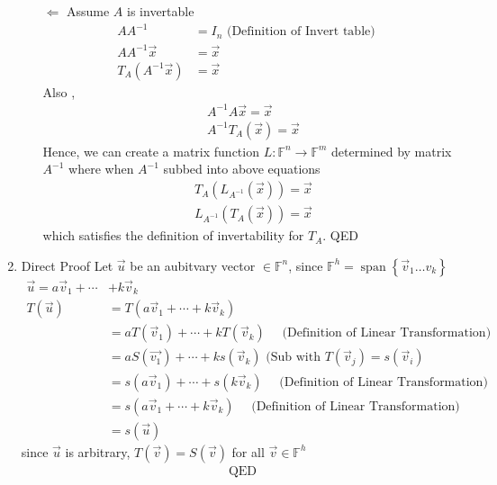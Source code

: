 \documentclass[11pt]{article}
\begin{document}
\begin{enumerate}[{\bf Q1.}]
\begin{enumerate}
			\newline $\Leftarrow$ \newline 
			Assume $A$ is invertable
			$$
			\begin{aligned}
			A A^{-1} & =I_n \text { (Definition of Invert table) } \\
			A A^{-1} \vec{x} & =\vec{x} \\
			T_A\left(A^{-1} \vec{x}\right) & =\vec{x}
			\end{aligned}
			$$
			Also ,
			$$
			\begin{aligned}
			& A^{-1} A \vec{x}=\vec{x} \\
			& A^{-1} T_A(\vec{x})=\vec{x}
			\end{aligned}
			$$
			Hence, we can create a matrix function $L: \mathbb{F}^n \rightarrow \mathbb{F}^m$ determined by matrix $A^{-1}$ where when $A^{-1}$ subbed into above equations
			$$
			\begin{aligned}
			& T_A\left(L_{A^{-1}}(\vec{x})\right)=\vec{x} \\
			& L_{A^{-1}}\left(T_A(\vec{x})\right)=\vec{x}
			\end{aligned}
			$$
			which satisfies the definition of invertability for $T_A$. \newline
			QED \newline
		\end{enumerate}
		
		\newpage
		
		\item
		Direct Proof \newline
		Let $\vec{u}$ be an aubitvary vector $\in \mathbb{F}^n$,
		since $\mathbb{F}^h=\operatorname{span}\left\{\vec{v}_1 \ldots v_k\right\}$
		$$
		\begin{aligned}
		\vec{u}=a \vec{v}_1+\cdots & +k \vec{v}_k \\
		T(\vec{u}) & =T\left(a \vec{v}_1+\cdots+k \vec{v}_k\right) \\
		& =a T\left(\vec{v}_1\right)+\cdots+k T\left(\vec{v}_k\right) \quad \text { (Definition of Linear Transformation) } \\
		& =a S\left(\overrightarrow{v_1}\right)+\cdots+k s\left(\vec{v}_k\right) \text { (Sub with } T\left(\vec{v}_j\right)=s\left(\vec{v}_i\right) \\
		& =s\left(a \vec{v}_1\right)+\cdots+s\left(k \vec{v}_k\right) \quad \text { (Definition of Linear Transformation) } \\
		& =s\left(a \vec{v}_1+\cdots+k \vec{v}_k\right) \quad \text { (Definition of Linear Transformation) } \\
		& =s(\vec{u})
		\end{aligned}
		$$
		since $\vec{u}$ is arbitrary, \newline
		$T(\vec{v})=S(\vec{v})$ for all $\vec{v} \in \mathbb{F}^h$
		$$
		\begin{aligned}
		& \text { QED } \\
		\end{aligned}
		$$
		

\end{enumerate}
\end{document}
